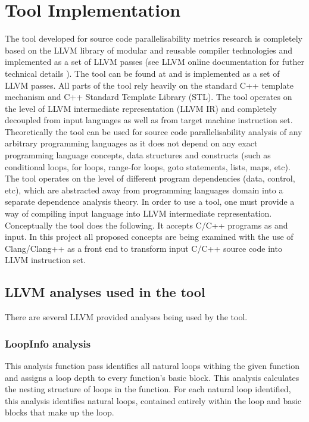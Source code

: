 \chapter{Tool Implementation}
\qquad The tool developed for source code parallelisability metrics research is completely based on the \textsc{LLVM} library of modular and reusable compiler technologies \cite{llvm} \cite{llvm-official-website} and implemented as a set of LLVM passes (see LLVM online documentation for futher technical details \cite{llvm-online-docs}). The tool can be found at \cite{ppar-tool} and is implemented as a set of LLVM passes. All parts of the tool rely heavily on the standard C++ template mechanism and C++ Standard Template Library (STL). \newline \null\qquad The tool operates on the level of LLVM intermediate representation \cite{llvm-online-docs-ir} (LLVM IR) and completely decoupled from input languages as well as from target machine instruction set. Theoretically the tool can be used for source code parallelisability analysis of any arbitrary programming languages as it does not depend on any exact programming language concepts, data structures and constructs (such as conditional loops, for loops, range-for loops, goto statements, lists, maps, etc). The tool operates on the level of different program dependencies (data, control, etc), which are abstracted away from programming languages domain into a separate dependence analysis theory. In order to use a tool, one must provide a way of compiling input language into LLVM intermediate representation. \newline \null\qquad Conceptually the tool does the following. It accepts C/C++ programs as and input. \newline \null\qquad In this project all proposed concepts are being examined with the use of Clang/Clang++ as a front end to transform input C/C++ source code into LLVM instruction set. 

\section{LLVM analyses used in the tool} 
\qquad There are several LLVM provided analyses being used by the tool.

\subsection{LoopInfo analysis}
\qquad This analysis function pass identifies all natural loops withing the given function and assigns a loop depth to every function's basic block. This analysis calculates the nesting structure of loops in the function. For each natural loop identified, this analysis identifies natural loops, contained entirely within the loop and basic blocks that make up the loop. 


